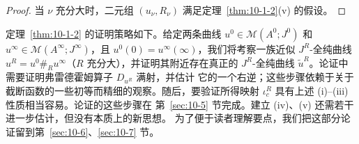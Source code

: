 \begin{proof}
当 $\nu$ 充分大时，二元组 $(u_\nu,R_\nu)$ 满足定理~\ref{thm:10-1-2}(v) 的假设。
\end{proof}

定理~\ref{thm:10-1-2} 的证明策略如下。给定两条曲线
$u^0\in\mathcal M(A^0;J^0)$ 和 $u^\infty\in\mathcal M(A^\infty;J^\infty)$，且
$u^0(0)=u^\infty(\infty)$，我们将考察一族近似 $J^R$-全纯曲线
$u^R=u^0\mathbin{\#_R}u^\infty$（$R$ 充分大），并证明其附近存在真正的
$J^R$-全纯曲线 $\widetilde u^R$。论证中需要证明弗雷德霍姆算子 $D_{u^R}$ 满射，并估计
它的一个右逆；这些步骤依赖于关于截断函数的一些初等而精细的观察。随后，要验证所得映射
$\iota_c^R$ 具有上述 (i)--(iii) 性质相当容易。论证的这些步骤在
第~\ref{sec:10-5} 节完成。建立 (iv)、(v) 还需若干进一步估计，但没有本质上的新思想。
为了便于读者理解要点，我们把这部分论证留到第~\ref{sec:10-6}、\ref{sec:10-7} 节。
